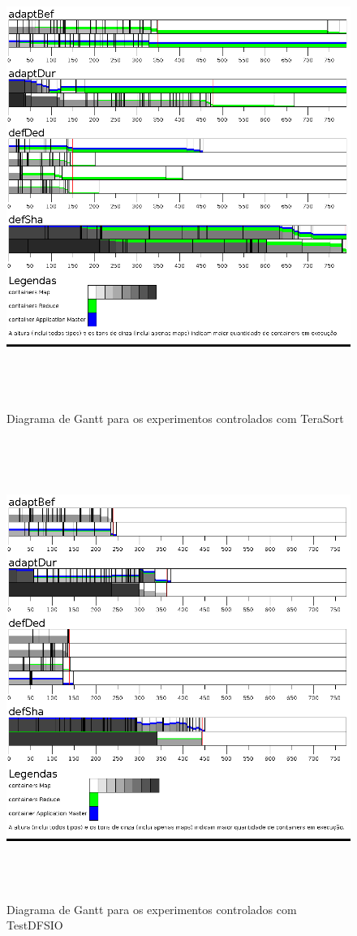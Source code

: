 \begin{figure}[!ht]
	\centering
	\includegraphics[height=15cm]{figuras/TS-simul.png}
	\caption{Diagrama de Gantt para os experimentos controlados com TeraSort}
	\label{fig:exp1TS}
\end{figure}

\begin{figure}[!ht]
	\centering
	\includegraphics[height=15cm]{figuras/DFS-simul.png} %
	\caption{Diagrama de Gantt para os experimentos controlados com TestDFSIO}
	\label{fig:exp1IO}
\end{figure}

